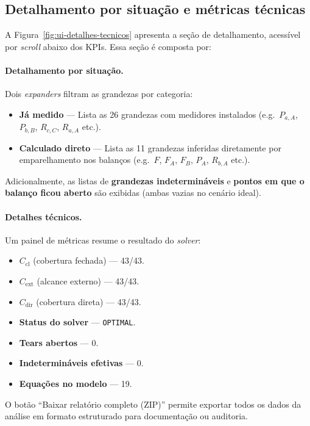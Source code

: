 \subsection{Detalhamento por situação e métricas técnicas}%
\label{ssec:ui-detalhes-tecnicos}

A Figura~\ref{fig:ui-detalhes-tecnicos} apresenta a seção de detalhamento,
acessível por \emph{scroll} abaixo dos KPIs. Essa seção é composta por:

\paragraph{Detalhamento por situação.}
Dois \emph{expanders} filtram as grandezas por categoria:
\begin{itemize}
  \item \textbf{Já medido} --- Lista as 26 grandezas com medidores
        instalados (e.g.\ $P_{a,A}$, $P_{b,B}$, $R_{c,C}$, $R_{a,A}$
        etc.).
  \item \textbf{Calculado direto} --- Lista as 11 grandezas inferidas
        diretamente por emparelhamento nos balanços (e.g.\ $F$, $F_A$,
        $F_B$, $P_A$, $R_{b,A}$ etc.).
\end{itemize}
Adicionalmente, as listas de \textbf{grandezas indetermináveis} e
\textbf{pontos em que o balanço ficou aberto} são exibidas (ambas vazias no
cenário ideal).

\paragraph{Detalhes técnicos.}
Um painel de métricas resume o resultado do \emph{solver}:
\begin{itemize}
  \item $C_{\text{cl}}$ (cobertura fechada) --- 43/43.
  \item $C_{\text{ext}}$ (alcance externo) --- 43/43.
  \item $C_{\text{dir}}$ (cobertura direta) --- 43/43.
  \item \textbf{Status do solver} --- \texttt{OPTIMAL}.
  \item \textbf{Tears abertos} --- 0.
  \item \textbf{Indetermináveis efetivas} --- 0.
  \item \textbf{Equações no modelo} --- 19.
\end{itemize}

O botão ``Baixar relatório completo (ZIP)'' permite exportar todos os dados
da análise em formato estruturado para documentação ou auditoria.

